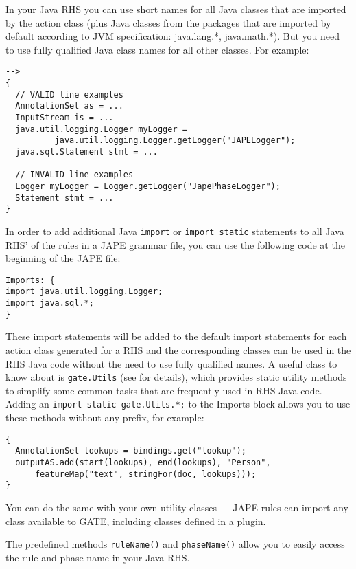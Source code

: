 In your Java RHS you can use short names for all Java classes that are
imported by the action class (plus Java classes from the packages that
are imported by default according to JVM specification: java.lang.*,
java.math.*).  But you need to use fully qualified Java class names
for all other classes. For example:

\begin{lstlisting}
-->
{
  // VALID line examples
  AnnotationSet as = ...
  InputStream is = ...
  java.util.logging.Logger myLogger =
          java.util.logging.Logger.getLogger("JAPELogger");
  java.sql.Statement stmt = ...

  // INVALID line examples
  Logger myLogger = Logger.getLogger("JapePhaseLogger");
  Statement stmt = ...
}
\end{lstlisting}

In order to add additional Java \lstinline!import! or \lstinline!import static!
statements to all Java RHS' of the rules in a JAPE grammar file, you can use
the following code at the beginning of the JAPE file:

\begin{lstlisting}
Imports: {
import java.util.logging.Logger;
import java.sql.*;
}
\end{lstlisting}

These import statements will be added to the default import statements for
each action class generated for a RHS and the corresponding classes can
be used in the RHS Java code without the need to use fully qualified names.
A useful class to know about is \lstinline!gate.Utils! (see
 for details), which
provides static utility methods to simplify some common tasks that are
frequently used in RHS Java code.  Adding an
\lstinline!import static gate.Utils.*;! to the Imports block allows you to use
these methods without any prefix, for example:

\begin{lstlisting}
{
  AnnotationSet lookups = bindings.get("lookup");
  outputAS.add(start(lookups), end(lookups), "Person",
      featureMap("text", stringFor(doc, lookups)));
}
\end{lstlisting}

You can do the same with your own utility classes --- JAPE rules can import any
class available to GATE, including classes defined in a plugin.

The predefined methods \verb!ruleName()! and \verb!phaseName()! allow you
to easily access the rule and phase name in your Java RHS.

